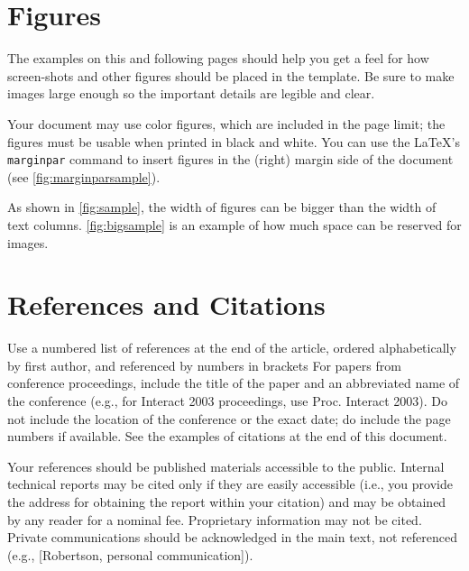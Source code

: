 \documentclass{chi-ext}
\begin{document}
\section{Figures}
The examples on this and following pages should help you get a feel for how screen-shots and other figures should be placed in the template. 
Be sure to make images large enough so the important details are legible and clear.

Your document may use color figures, which are included in the page limit; the figures must be usable when printed in black and white.
You can use the \LaTeX's \texttt{marginpar} command to insert figures in the (right) margin side of the document (see \autoref{fig:marginparsample}).

As shown in \autoref{fig:sample}, the width of figures can be bigger than the width of text columns.
\autoref{fig:bigsample} is an example of how much space can be reserved for images.


\section{References and Citations}
Use a numbered list of references at the end of the article, ordered alphabetically by first author, and referenced by numbers in brackets %
For papers from conference proceedings, include the title of the paper and an abbreviated name of the conference (e.g., for Interact 2003 proceedings, use Proc. Interact 2003). 
Do not include the location of the conference or the exact date; do include the page numbers if available. 
See the examples of citations at the end of this document. 

Your references should be published materials accessible to the public.  
Internal technical reports may be cited only if they are easily accessible (i.e., you provide the address for obtaining the report within your citation) and may be obtained by any reader for a nominal fee.  
Proprietary information may not be cited. 
Private communications should be acknowledged in the main text, not referenced  (e.g., [Robertson, personal communication]).
\end{document}

